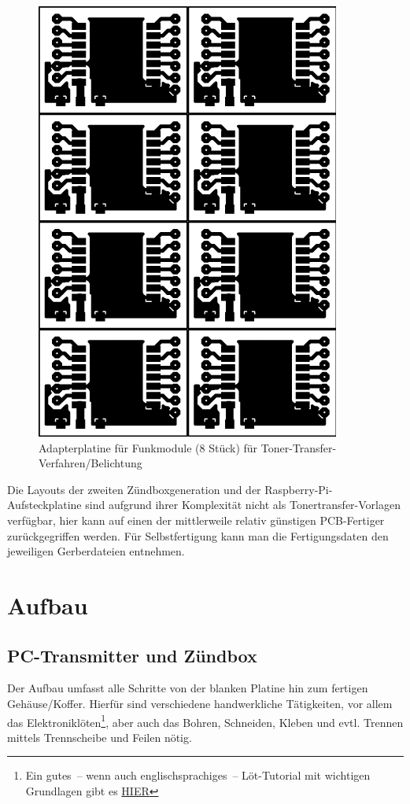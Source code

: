 \documentclass[paper=a4, parskip, numbers=noenddot, toc=listof, headsepline]{scrbook}
\begin{document}
			\begin{figure}
				\centering
				\includegraphics[scale=1]{Bilder/rfm-dil-70x100}
				\caption{Adapterplatine für Funkmodule (8 Stück) für Toner-Transfer-Verfahren/Belichtung}
				\label{fig:rfmprint}
			\end{figure}

			Die Layouts der zweiten Zündboxgeneration und der Raspberry-Pi-Aufsteckplatine sind aufgrund ihrer Komplexität nicht als Tonertransfer-Vorlagen verfügbar, hier kann auf einen der mittlerweile relativ günstigen PCB-Fertiger zurückgegriffen werden. Für Selbstfertigung kann man die Fertigungsdaten den jeweiligen Gerberdateien entnehmen.

		\chapter{Aufbau}

			\section{PC-Transmitter und Zündbox}

				Der Aufbau umfasst alle Schritte von der blanken Platine hin zum fertigen Gehäuse/Koffer. Hierfür sind verschiedene handwerkliche Tätigkeiten, vor allem das Elektroniklöten\footnote{Ein gutes~-- wenn auch englischsprachiges~-- Löt-Tutorial mit wichtigen Grundlagen gibt es \href{https://www.youtube.com/watch?v=I_NU2ruzyc4}{HIER}}, aber auch das Bohren, Schneiden, Kleben und evtl. Trennen mittels Trennscheibe und Feilen nötig.
\end{document}
